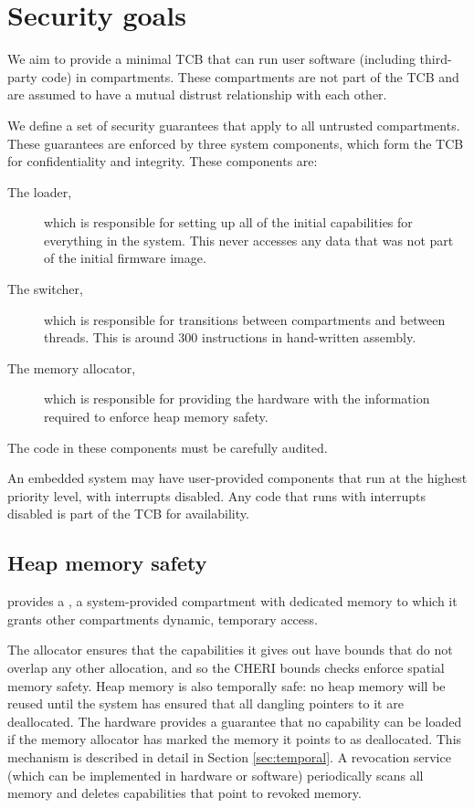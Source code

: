 \section{Security goals}

We aim to provide a minimal TCB that can run user software (including third-party code) in compartments.
These compartments are not part of the TCB and are assumed to have a mutual distrust relationship with each other.

We define a set of security guarantees that apply to all untrusted compartments.
These guarantees are enforced by three system components, which form the TCB for confidentiality and integrity.
These components are:

\begin{description}
	\item[The loader,] which is responsible for setting up all of the initial capabilities for everything in the system.
		This never accesses any data that was not part of the initial firmware image.
	\item[The switcher,] which is responsible for transitions between compartments and between threads.
		This is around 300 instructions in hand-written assembly.
	\item[The memory allocator,] which is responsible for providing the hardware with the information required to enforce heap memory safety.
\end{description}

The code in these components must be carefully audited.

An embedded system may have user-provided components that run at the highest priority level, with interrupts disabled.
Any code that runs with interrupts disabled is part of the TCB for availability.


\subsection{Heap memory safety}

\cherimcuos{} provides a , a system-provided compartment with dedicated memory to which it grants other compartments dynamic, temporary access.

The allocator ensures that the capabilities it gives out have bounds that do not overlap any other allocation, and so the CHERI bounds checks enforce spatial memory safety.
Heap memory is also temporally safe: no heap memory will be reused until the system has ensured that all dangling pointers to it are deallocated.
The hardware provides a guarantee that no capability can be loaded if the memory allocator has marked the memory it points to as deallocated.
This mechanism is described in detail in Section \ref{sec:temporal}.
A revocation service (which can be implemented in hardware or software) periodically scans all memory and deletes capabilities that point to revoked memory.

